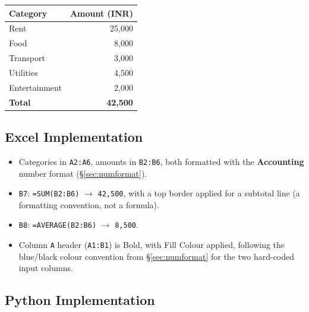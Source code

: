 \documentclass[11pt,a4paper]{article}
\begin{document}
\begin{center}
\begin{tabular}{@{}lr@{}}
\toprule
\textbf{Category} & \textbf{Amount (INR)} \\
\midrule
Rent & 25,000 \\
Food & 8,000 \\
Transport & 3,000 \\
Utilities & 4,500 \\
Entertainment & 2,000 \\
\midrule
\textbf{Total} & \textbf{42,500} \\
\bottomrule
\end{tabular}
\end{center}

\subsection{Excel Implementation}

\begin{itemize}
  \item Categories in \texttt{A2:A6}, amounts in \texttt{B2:B6}, both formatted with the \textbf{Accounting} number format (\S\ref{sec:numformat}).
  \item \texttt{B7}: \texttt{=SUM(B2:B6)} $\rightarrow$ \texttt{42,500}, with a top border applied for a subtotal line (a formatting convention, not a formula).
  \item \texttt{B8}: \texttt{=AVERAGE(B2:B6)} $\rightarrow$ \texttt{8,500}.
  \item Column \texttt{A} header (\texttt{A1:B1}) is Bold, with Fill Colour applied, following the blue/black colour convention from \S\ref{sec:numformat} for the two hard-coded input columns.
\end{itemize}

\subsection{Python Implementation}
\end{document}
